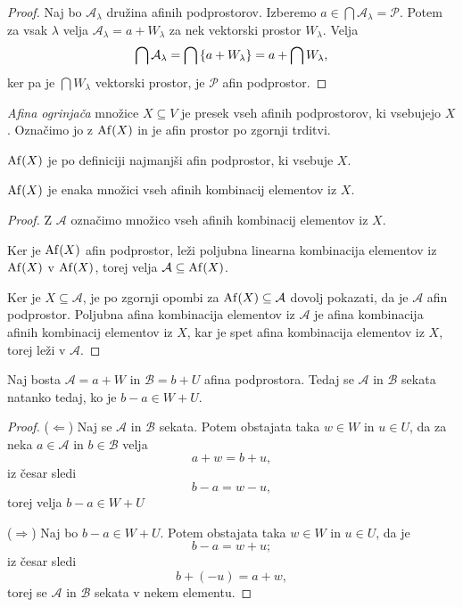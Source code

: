 \begin{proof}
    Naj bo $\mathcal{A}_{\lambda}$ družina afinih podprostorov. Izberemo $a \in \bigcap \mathcal{A}_{\lambda} = \mathcal{P}$. Potem za vsak $\lambda$ velja $\mathcal{A}_{\lambda} = a + W_{\lambda}$ za nek vektorski prostor $W_{\lambda}$. Velja
    \[
    \bigcap \mathcal{A}_{\lambda} = \bigcap \left\{a + W_{\lambda}\right\} = a + \bigcap W_{\lambda},
    \]
    ker pa je $\bigcap W_{\lambda}$ vektorski prostor, je $\mathcal{P}$ afin podprostor.
\end{proof}

\begin{definicija}
    \emph{Afina ogrinjača} množice $X \subseteq V$ je presek vseh afinih podprostorov, ki vsebujejo $X$. Označimo jo z $\operatorname{Af} (X)$ in je afin prostor po zgornji trditvi.
\end{definicija}

\begin{opomba}
    $\operatorname{Af} (X)$ je po definiciji najmanjši afin podprostor, ki vsebuje $X$.
\end{opomba}

\begin{trditev}
    $\operatorname{Af} (X)$ je enaka množici vseh afinih kombinacij elementov iz $X$.
\end{trditev}

\begin{proof}
    Z $\mathcal{A}$ označimo množico vseh afinih kombinacij elementov iz $X$.

    Ker je $\operatorname{Af} (X)$ afin podprostor, leži poljubna linearna kombinacija elementov iz $\operatorname{Af} (X)$ v $\operatorname{Af} (X)$, torej velja $\mathcal{A} \subseteq \operatorname{Af} (X)$.

    Ker je $X \subseteq \mathcal{A}$, je po zgornji opombi za $\operatorname{Af} (X) \subseteq \mathcal{A}$ dovolj pokazati, da je $\mathcal{A}$ afin podprostor. Poljubna afina kombinacija elementov iz $\mathcal{A}$ je afina kombinacija afinih kombinacij elementov iz $X$,
    kar je spet afina kombinacija elementov iz $X$, torej leži v $\mathcal{A}$.
\end{proof}

\begin{lema}
    Naj bosta $\mathcal{A} = a + W$ in $\mathcal{B} = b + U$ afina podprostora. Tedaj se $\mathcal{A}$ in $\mathcal{B}$ sekata natanko tedaj, ko je $b - a \in W + U$.
\end{lema}

\begin{proof}
    ($\Leftarrow$)
    Naj se $\mathcal{A}$ in $\mathcal{B}$ sekata. Potem obstajata taka $w \in W$ in $u \in U$, da za neka $a \in \mathcal{A}$ in $b \in \mathcal{B}$ velja
    \[
    a + w = b + u,    
    \]
    iz česar sledi
    \[
    b - a = w - u,    
    \]
    torej velja $b - a \in W + U$

    ($\Rightarrow$)
    Naj bo $b - a \in W + U$. Potem obstajata taka $w \in W$ in $u \in U$, da je
    \[
    b - a = w + u;    
    \]
    iz česar sledi
    \[
    b + (- u) = a + w,    
    \]
    torej se $\mathcal{A}$ in $\mathcal{B}$ sekata v nekem elementu.
\end{proof}

